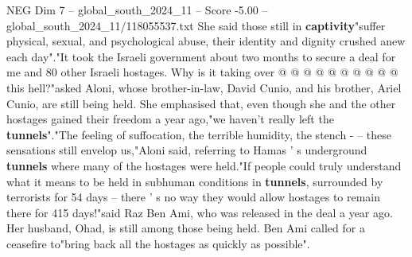 \begin{textsample}{NEG Dim 7 – global\_south\_2024\_11 – Score -5.00 – global\_south\_2024\_11/118055537.txt}
She said those still in \textbf{captivity}"suffer physical, sexual, and psychological abuse, their identity and dignity crushed anew each day"."It took the Israeli government about two months to secure a deal for me and 80 other Israeli hostages.
Why is it taking over @ @ @ @ @ @ @ @ @ @ this hell?"asked Aloni, whose brother-in-law, David Cunio, and his brother, Ariel Cunio, are still being held.
She emphasised that, even though she and the other hostages gained their freedom a year ago,"we haven't really left the \textbf{tunnels}"."The feeling of suffocation, the terrible humidity, the stench - -- these sensations still envelop us,"Aloni said, referring to Hamas ' s underground \textbf{tunnels} where many of the hostages were held."If people could truly understand what it means to be held in subhuman conditions in \textbf{tunnels}, surrounded by terrorists for 54 days -- there ' s no way they would allow hostages to remain there for 415 days!"said Raz Ben Ami, who was released in the deal a year ago.
Her husband, Ohad, is still among those being held.
Ben Ami called for a ceasefire to"bring back all the hostages as quickly as possible".

\end{textsample}
